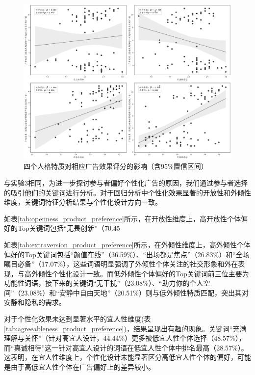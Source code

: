\begin{figure}[H]
    \centering
    \includegraphics[width=1.0\linewidth]{Image/Study1-exp4-result.png}
    \caption{\label{fig:Study1-exp4-result}四个人格特质对相应广告效果评分的影响（含95\%置信区间）}
\end{figure}

与实验3相同，为进一步探讨参与者偏好个性化广告的原因，我们通过参与者选择的吸引他们的关键词进行分析。对于回归分析中个性化效果显著的开放性和外倾性维度，关键词特征分析结果与个性化设计方向一致。

如表\ref{tab:openness_product_preference}所示，在开放性维度上，高开放性个体偏好的Top关键词包括“无畏创新”（70.45%

如表\ref{tab:extraversion_product_preference}所示，在外倾性维度上，高外倾性个体偏好的Top关键词包括“颜值在线”（36.59\%）、“出场都是焦点”（26.83\%）和“全场瞩目必备”（17.07\%），这些词语明显强调了外倾性个体关注的社交形象和外在表现，与高外倾性个性化设计一致。而低外倾性个体偏好的Top关键词前三位主要为功能性词语，接下来的关键词“无干扰”（23.08\%）、“助力你的个人空间”（23.08\%）和“安静中自由天地”（20.51\%）则与低外倾性特质匹配，突出其对安静和隐私的需求。

对于个性化效果未达到显著水平的宜人性维度(表 \ref{tab:agreeableness_product_preference})，结果呈现出有趣的现象。关键词“充满理解与关怀”（针对高宜人设计，44.44\%）更多被低宜人性个体选择（48.57\%），而“真诚相待”这一针对高宜人设计的词语在低宜人性个体中排名最高（28.57\%）。这表明，在宜人性维度上，个性化设计未能显著区分高低宜人性个体的偏好，可能是由于高低宜人性个体在广告偏好上的差异较小。


